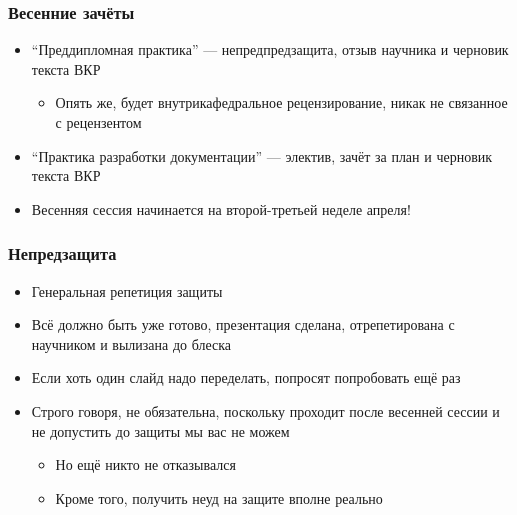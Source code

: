 \documentclass{../../slides-style}
\begin{document}
    \begin{frame}
        \frametitle{Весенние зачёты}
        \begin{itemize}
            \item ``Преддипломная практика'' --- непредпредзащита, отзыв научника и черновик текста ВКР
            \begin{itemize}
                \item Опять же, будет внутрикафедральное рецензирование, никак не связанное с рецензентом
            \end{itemize}
            \item ``Практика разработки документации'' --- электив, зачёт за план и черновик текста ВКР
            \item Весенняя сессия начинается на второй-третьей неделе апреля!
        \end{itemize}
    \end{frame}

    \begin{frame}
        \frametitle{Непредзащита}
        \begin{itemize}
            \item Генеральная репетиция защиты
            \item Всё должно быть уже готово, презентация сделана, отрепетирована с научником и вылизана до блеска
            \item Если хоть один слайд надо переделать, попросят попробовать ещё раз
            \item Строго говоря, не обязательна, поскольку проходит после весенней сессии и не допустить до защиты мы вас не можем
            \begin{itemize}
                \item Но ещё никто не отказывался
                \item Кроме того, получить неуд на защите вполне реально
            \end{itemize}
        \end{itemize}
    \end{frame}
\end{document}
